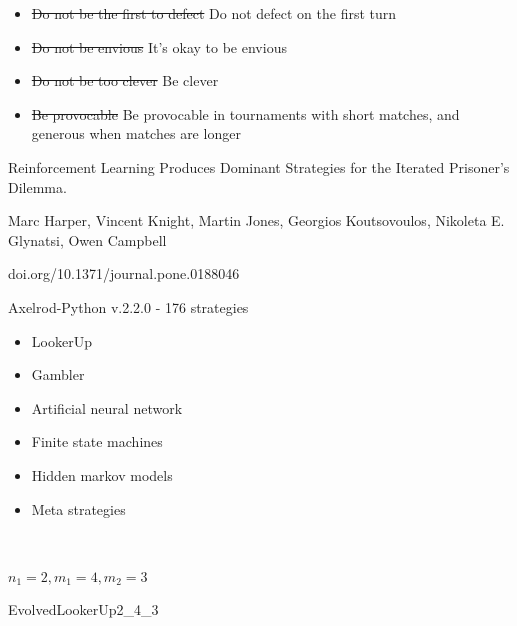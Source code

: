\documentclass{beamer}
\begin{document}
\begin{frame}
    \begin{itemize}
    \item \st{Do not be the first to defect} Do not defect on the first turn
    \item \st{Do not be envious} It's okay to be envious 
    \item \st{Do not be too clever} Be clever
    \item \st{Be provocable} Be provocable in tournaments with short matches, and generous when matches are longer
    \end{itemize}
\end{frame}

\begin{frame}
    \centering
    Reinforcement Learning Produces Dominant Strategies for the Iterated Prisoner's Dilemma. \\
    \vspace{.5cm}

    \tiny{Marc Harper, Vincent Knight, Martin Jones, Georgios Koutsovoulos, Nikoleta E. Glynatsi, Owen Campbell\\
    \vspace{.5cm}

    doi.org/10.1371/journal.pone.0188046 \\
    \vspace{.5cm}
    
    Axelrod-Python v.2.2.0 - 176 strategies}
\end{frame}

\begin{frame}
    \begin{multicols}{2}
        \begin{itemize}
            \item LookerUp
            \item Gambler
            \item Artificial neural network
            \item Finite state machines
            \item Hidden markov models
            \item Meta strategies
        \end{itemize}
        \end{multicols}
\end{frame}

\begin{frame}
    \begin{center}
     \\
    \vspace{.5cm}
    \pause

    \small
    \(n_1 = 2, m_1 = 4, m_2 =3 \) \\
    \vspace{.2cm}
    \pause

    EvolvedLookerUp2\_4\_3
    \end{center}
\end{frame}
\end{document}

